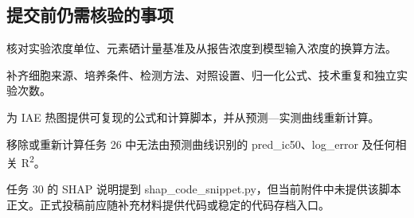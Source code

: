 \subsection*{提交前仍需核验的事项}

核对实验浓度单位、元素硒计量基准及从报告浓度到模型输入浓度的换算方法。

补齐细胞来源、培养条件、检测方法、对照设置、归一化公式、技术重复和独立实验次数。

为 IAE 热图提供可复现的公式和计算脚本，并从预测—实测曲线重新计算。

移除或重新计算任务 26 中无法由预测曲线识别的 pred\_ic50、log\_error 及任何相关 R\textsuperscript{2}。

任务 30 的 SHAP 说明提到 shap\_code\_snippet.py，但当前附件中未提供该脚本正文。正式投稿前应随补充材料提供代码或稳定的代码存档入口。
